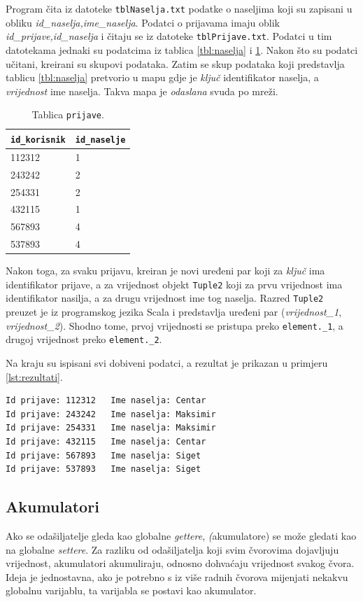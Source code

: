 \documentclass[times, utf8, zavrsni, numeric]{fer}
\begin{document}
Program čita iz datoteke \texttt{tblNaselja.txt} podatke o naseljima koji su zapisani u obliku \emph{id\_naselja,ime\_naselja}. Podatci o prijavama imaju oblik \emph{id\_prijave,id\_naselja} i čitaju se iz datoteke \texttt{tblPrijave.txt}. Podatci u tim datotekama jednaki su podatcima iz tablica \ref{tbl:naselja} i \ref{tbl:prijave}. Nakon što su podatci učitani, kreirani su skupovi podataka. Zatim se skup podataka koji predstavlja tablicu \ref{tbl:naselja} pretvorio u mapu gdje je \emph{ključ} identifikator naselja, a \emph{vrijednost} ime naselja. Takva mapa je \emph{odaslana} svuda po mreži. 

\begin{table}[htb]
\caption{Tablica \texttt{prijave}.}
\label{tbl:prijave}
\centering
\begin{tabular}{ll} 
\hline
\texttt{id\_korisnik} & \texttt{id\_naselje}\\
\hline
112312 & 1\\
243242 & 2\\
254331 & 2\\
432115 & 1\\
567893 & 4\\
537893 & 4\\
\hline
\end{tabular}
\end{table}

Nakon toga, za svaku prijavu, kreiran je novi uređeni par koji za \emph{ključ} ima identifikator prijave, a za vrijednost objekt \texttt{Tuple2} koji za prvu vrijednost ima identifikator nasilja, a za drugu vrijednost ime tog naselja. Razred \texttt{Tuple2} preuzet je iz programskog jezika Scala i predstavlja uređeni par (\emph{vrijednost\_1}, \emph{vrijednost\_2}). Shodno tome, prvoj vrijednosti se pristupa preko \texttt{element.\_1}, a drugoj vrijednost preko \texttt{element.\_2}.

Na kraju su ispisani svi dobiveni podatci, a rezultat je prikazan u primjeru \ref{lst:rezultati}.
\begin{lstlisting}[label={lst:rezultati}, caption={Identifikatori prijave i imena naselja odakle su prijave poslane.}]
Id prijave: 112312 	 Ime naselja: Centar
Id prijave: 243242 	 Ime naselja: Maksimir
Id prijave: 254331 	 Ime naselja: Maksimir
Id prijave: 432115 	 Ime naselja: Centar
Id prijave: 567893 	 Ime naselja: Siget
Id prijave: 537893 	 Ime naselja: Siget
\end{lstlisting}

\subsection{Akumulatori}
Ako se odašiljatelje gleda kao globalne \emph{gettere}, \emph(akumulatore)  se može gledati kao na globalne \emph{settere}. Za razliku od odašiljatelja koji svim čvorovima dojavljuju vrijednost, akumulatori akumuliraju, odnosno dohvaćaju vrijednost svakog čvora. Ideja je jednostavna, ako je potrebno s iz više radnih čvorova mijenjati nekakvu globalnu varijablu, ta varijabla se postavi kao akumulator.
\end{document}
